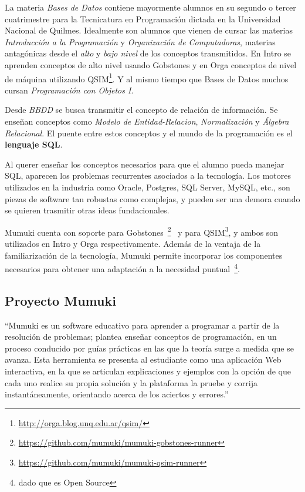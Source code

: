 
La materia \textit{Bases de Datos} contiene mayormente
alumnos en su segundo o tercer cuatrimestre para
la Tecnicatura en Programación dictada en la Universidad
Nacional de Quilmes. Idealmente son alumnos que
vienen de cursar las materias \textit{Introducción
a la Programación} y \textit{Organización de Computadoras},
materias antagónicas desde el \textit{alto} y \textit{bajo nivel}
de los conceptos transmitidos. En Intro se aprenden conceptos
de alto nivel usando Gobstones y en Orga conceptos de nivel
de máquina utilizando QSIM\footnote{\url{http://orga.blog.unq.edu.ar/qsim/}}.
Y al mismo tiempo que Bases de Datos muchos cursan
\textit{Programación con Objetos I}.

Desde \textit{BBDD} se busca transmitir el concepto de relación
de información. Se enseñan conceptos como \textit{Modelo de
Entidad-Relacion}, \textit{Normalización} y \textit{Álgebra Relacional}.
El puente entre estos conceptos y el mundo de la programación
es el \textbf{lenguaje SQL}.

Al querer enseñar los conceptos necesarios para que el alumno
pueda manejar SQL, aparecen los problemas recurrentes asociados
a la tecnología. Los motores utilizados en la industria como
Oracle, Postgres, SQL Server, MySQL, etc., son piezas de software
tan robustas como complejas, y pueden ser una demora cuando se
quieren trasmitir otras ideas fundacionales.

Mumuki cuenta con soporte para Gobstones~\footnote{\url{https://github.com/mumuki/mumuki-gobstones-runner}}~\cite{MumukiGobstonesAloi}
y para QSIM\footnote{\url{https://github.com/mumuki/mumuki-qsim-runner}},
y ambos son utilizados en Intro y Orga respectivamente.
Además de la ventaja de la familiarización de la tecnología,
Mumuki permite incorporar los componentes necesarios para
obtener una adaptación a la necesidad puntual~\footnote{dado que
es Open Source}.


\subsection{Proyecto Mumuki}

\begin{displayquote}
``Mumuki es un software educativo para aprender a programar a partir de la resolución de problemas;
plantea enseñar conceptos de programación, en un proceso conducido por guías prácticas
en las que la teoría surge a medida que se avanza. Esta herramienta se presenta al
estudiante como una aplicación Web interactiva, en la que se articulan explicaciones
y ejemplos con la opción de que cada uno realice su propia solución y la plataforma
la pruebe y corrija instantáneamente, orientando acerca de los aciertos y errores.''
\end{displayquote}

